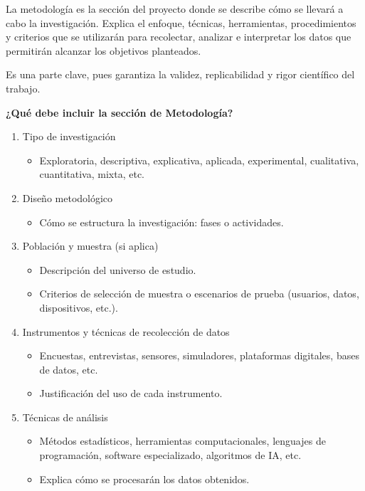 La metodología es la sección del proyecto donde se describe cómo se llevará a cabo la investigación. Explica el enfoque, técnicas, herramientas, procedimientos y criterios que se utilizarán para recolectar, analizar e interpretar los datos que permitirán alcanzar los objetivos planteados.

Es una parte clave, pues garantiza la validez, replicabilidad y rigor científico del trabajo.

\textbf{¿Qué debe incluir la sección de Metodología?}

\begin{enumerate}
    \item Tipo de investigación
    \begin{itemize}
        \item Exploratoria, descriptiva, explicativa, aplicada, experimental, cualitativa, cuantitativa, mixta, etc.
    \end{itemize}
    \item Diseño metodológico
    \begin{itemize}
        \item Cómo se estructura la investigación: fases o actividades.
    \end{itemize}
    \item Población y muestra (si aplica)
    \begin{itemize}
        \item Descripción del universo de estudio.
        \item Criterios de selección de muestra o escenarios de prueba (usuarios, datos, dispositivos, etc.).
    \end{itemize}
    \item Instrumentos y técnicas de recolección de datos
    \begin{itemize}
        \item Encuestas, entrevistas, sensores, simuladores, plataformas digitales, bases de datos, etc.
        \item Justificación del uso de cada instrumento.
    \end{itemize}
    \item Técnicas de análisis
    \begin{itemize}
        \item Métodos estadísticos, herramientas computacionales, lenguajes de programación, software especializado, algoritmos de IA, etc.
        \item Explica cómo se procesarán los datos obtenidos.
    \end{itemize}

\end{enumerate}
